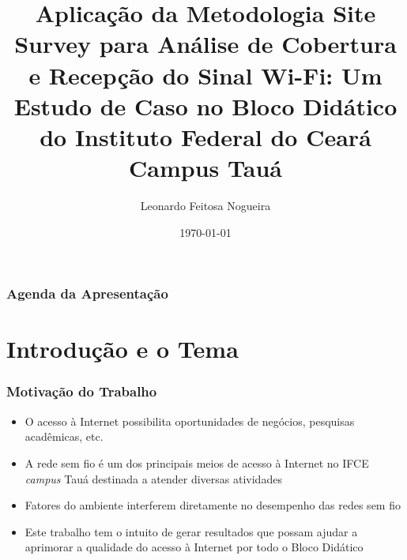 \documentclass[aspectratio=169,12pt]{beamer}
\title[\textbf{Trabalho de Conclusão de Curso em Tecnologia em Telemática}]{{\Large Aplicação da Metodologia Site Survey para Análise de Cobertura e Recepção do Sinal Wi-Fi: Um Estudo de Caso no Bloco Didático do Instituto Federal do Ceará Campus Tauá}}
\author{Leonardo Feitosa Nogueira}
\institute{INSTITUTO FEDERAL DO CEARÁ -- IFCE CAMPUS TAUÁ}
\date[IFCE Campus Tauá]{\today}
\begin{document}
\begin{frame}[t,plain]
	\titlepage
\end{frame}
\begin{frame}
	\frametitle{Agenda da Apresentação}
	\tableofcontents
\end{frame}
\section{Introdução e o Tema}
\begin{frame}
	\frametitle{Motivação do Trabalho}
	\begin{itemize}
		\item O acesso à Internet possibilita oportunidades de negócios, pesquisas acadêmicas, etc.
		
		\item A rede sem fio é um dos principais meios de acesso à Internet no IFCE \textit{campus} Tauá destinada a atender diversas atividades
		
		\item Fatores do ambiente interferem diretamente no desempenho das redes sem fio
		
		\item Este trabalho tem o intuito de gerar resultados que possam ajudar a aprimorar a qualidade do acesso à Internet por todo o Bloco Didático
	\end{itemize}
\end{frame}
\end{document}
